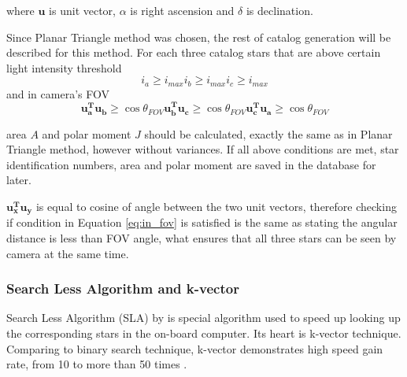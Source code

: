 \documentclass[12pt,a4paper,twoside]{article}
\begin{document}
where $\bm{u}$ is unit vector, $\alpha$ is right ascension and $\delta$ is declination.

Since Planar Triangle method was chosen, the rest of catalog generation will be described for this method. For each three catalog stars that are above certain light intensity threshold
\begin{subequations}
\begin{equation}
i_a \geq i_{max}
\end{equation}
\begin{equation}
i_b \geq i_{max}
\end{equation}
\begin{equation}
i_c \geq i_{max}
\end{equation}
\end{subequations}
and in camera's FOV
\begin{subequations}
\begin{equation}
\bm{u_a^T u_b} \geq \cos \theta_{FOV}
\end{equation}
\begin{equation}
\bm{u_b^T u_c} \geq \cos \theta_{FOV}
\end{equation}
\begin{equation}
\bm{u_c^T u_a} \geq \cos \theta_{FOV}
\end{equation}
\label{eq:in_fov}
\end{subequations}

area $A$ and polar moment $J$ should be calculated, exactly the same as in Planar Triangle method, however without variances. If all above conditions are met, star identification numbers, area and polar moment are saved in the database for later.

$\bm{u_x^T u_y}$ is equal to cosine of angle between the two unit vectors, therefore checking if condition in Equation \ref{eq:in_fov} is satisfied is the same as stating the angular distance is less than FOV angle, what ensures that all three stars can be seen by camera at the same time.

\subsubsection{Search Less Algorithm and k-vector}

Search Less Algorithm (SLA) by \citet{mortari1996fast} is special algorithm used to speed up looking up the corresponding stars in the on-board computer. Its heart is k-vector technique. Comparing to binary search technique, k-vector demonstrates high speed gain rate, from 10 to more than 50 times \cite{mortari2000k}.
\end{document}
